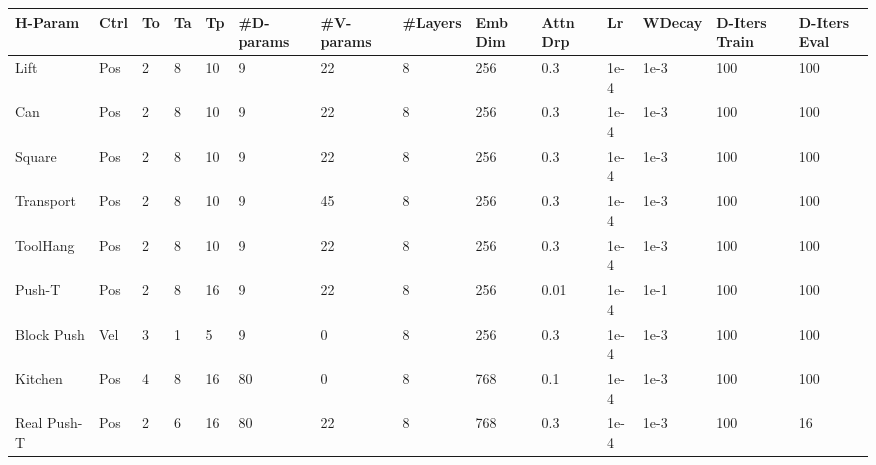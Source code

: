 \setlength\tabcolsep{2.1 pt}
\begin{tabular}{l|lllllllllllll}
\toprule
           
\textbf{H-Param} & \textbf{Ctrl} & \textbf{To} & \textbf{Ta} & \textbf{Tp} & \textbf{\#D-params} & \textbf{\#V-params} & \textbf{\#Layers} & \textbf{Emb Dim} & \textbf{Attn Drp} & \textbf{Lr} & \textbf{WDecay} & \textbf{D-Iters Train} & \textbf{D-Iters Eval} \\

\midrule
Lift       & Pos  & 2  & 8  & 10 & 9        & 22       & 8      & 256     & 0.3          & 1e-4 & 1e-3   & 100           & 100          \\
Can        & Pos  & 2  & 8  & 10 & 9        & 22       & 8      & 256     & 0.3          & 1e-4 & 1e-3   & 100           & 100          \\
Square     & Pos  & 2  & 8  & 10 & 9        & 22       & 8      & 256     & 0.3          & 1e-4 & 1e-3   & 100           & 100          \\
Transport  & Pos  & 2  & 8  & 10 & 9        & 45       & 8      & 256     & 0.3          & 1e-4 & 1e-3   & 100           & 100          \\
ToolHang   & Pos  & 2  & 8  & 10 & 9        & 22       & 8      & 256     & 0.3          & 1e-4 & 1e-3   & 100           & 100          \\
Push-T     & Pos  & 2  & 8  & 16 & 9        & 22       & 8      & 256     & 0.01         & 1e-4 & 1e-1   & 100           & 100          \\
Block Push & Vel  & 3  & 1  & 5  & 9        & 0        & 8      & 256     & 0.3          & 1e-4 & 1e-3   & 100           & 100          \\
Kitchen    & Pos  & 4  & 8  & 16 & 80       & 0        & 8      & 768     & 0.1          & 1e-4 & 1e-3   & 100           & 100          \\
\midrule
Real Push-T     & Pos  & 2  & 6  & 16 & 80      & 22       & 8      & 768     & 0.3          & 1e-4 & 1e-3   & 100           & 16           \\
\bottomrule
\end{tabular}
